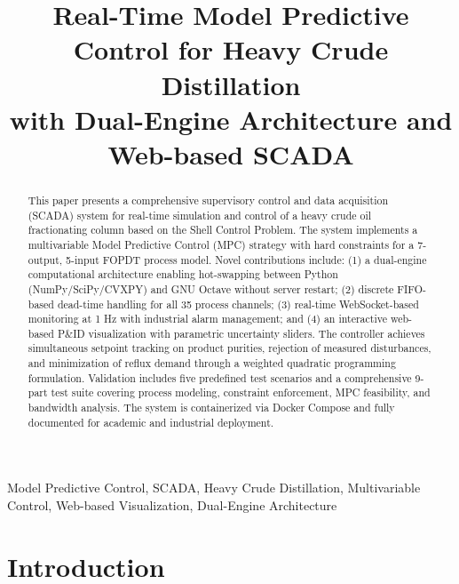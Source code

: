 \documentclass[conference]{IEEEtran}
\begin{document}
\title{Real-Time Model Predictive Control for Heavy Crude Distillation \\
with Dual-Engine Architecture and Web-based SCADA}

\author{
}

\maketitle

\begin{abstract}
This paper presents a comprehensive supervisory control and data acquisition (SCADA) system for real-time simulation and control of a heavy crude oil fractionating column based on the Shell Control Problem. The system implements a multivariable Model Predictive Control (MPC) strategy with hard constraints for a 7-output, 5-input FOPDT process model. Novel contributions include: (1) a dual-engine computational architecture enabling hot-swapping between Python (NumPy/SciPy/CVXPY) and GNU Octave without server restart; (2) discrete FIFO-based dead-time handling for all 35 process channels; (3) real-time WebSocket-based monitoring at 1 Hz with industrial alarm management; and (4) an interactive web-based P\&ID visualization with parametric uncertainty sliders. The controller achieves simultaneous setpoint tracking on product purities, rejection of measured disturbances, and minimization of reflux demand through a weighted quadratic programming formulation. Validation includes five predefined test scenarios and a comprehensive 9-part test suite covering process modeling, constraint enforcement, MPC feasibility, and bandwidth analysis. The system is containerized via Docker Compose and fully documented for academic and industrial deployment.
\end{abstract}

\begin{IEEEkeywords}
Model Predictive Control, SCADA, Heavy Crude Distillation, Multivariable Control, Web-based Visualization, Dual-Engine Architecture
\end{IEEEkeywords}

\section{Introduction}
\end{document}
